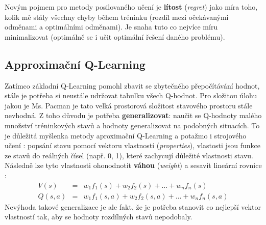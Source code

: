 Novým pojmem pro metody posilovaného učení je \textbf{lítost} (\textit{regret}) jako míra toho, kolik mě stály všechny chyby během tréninku (rozdíl mezi očekávanými odměnami a optimálními odměnami). Je snaha tuto co nejvíce míru minimalizovat (optimálně se i učit optimální řešení daného problému).

\subsection{Approximační Q-Learning}
Zatímco základní Q-Learning pomohl zbavit se zbytečného přepočítávání hodnot, stále je potřeba si neustále udržovat tabulku všech Q-hodnot. Pro složitou úlohu jakou je Ms. Pacman je tato velká prostorová složitost stavového prostoru stále nevhodná. Z toho důvodu je potřeba \textbf{generalizovat}: naučit se Q-hodnoty malého množství tréninkových stavů a hodnoty generalizovat na podobných situacích. To je důležitá myšlenka metody aproximační Q-Learning a potažmo i strojového učení \cite{RLAprox}:
\newline
popsání stavu pomocí vektoru vlastností (\textit{properties}), vlastosti jsou funkce ze stavů do reálných čísel (např. 0, 1), které zachycují důležité vlastnosti stavu. Následně lze tyto vlastnosti ohonodnotit \textbf{váhou} (\textit{weight}) a sesavit lineární rovnice \cite{RLAprox}:
\begin{eqnarray}
V(s) &=& w_1f_1(s) + w_2f_2(s) + \dots + w_nf_n(s) \\
Q(s,a) &=& w_1f_1(s,a) + w_2f_2(s,a) + \dots + w_nf_n(s,a)
\end{eqnarray}
Nevýhoda takové generalizace je ale fakt, že je potřeba stanovit co nejlepší vektor vlastností tak, aby se hodnoty rozdílných stavů nepodobaly.
